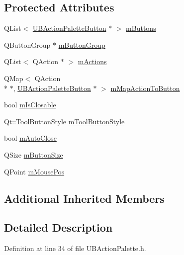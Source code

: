\subsection*{Protected Attributes}
\begin{DoxyCompactItemize}
\item 
Q\-List$<$ \hyperlink{class_u_b_action_palette_button}{U\-B\-Action\-Palette\-Button} $\ast$ $>$ \hyperlink{class_u_b_action_palette_a533f91782bfb170d961413b39671ed03}{m\-Buttons}
\item 
Q\-Button\-Group $\ast$ \hyperlink{class_u_b_action_palette_abee5fd5d774e46838952b4632add4e46}{m\-Button\-Group}
\item 
Q\-List$<$ Q\-Action $\ast$ $>$ \hyperlink{class_u_b_action_palette_a5c4efb6a44c5e95f151c9ab00cdd57f7}{m\-Actions}
\item 
Q\-Map$<$ Q\-Action \\*
$\ast$, \hyperlink{class_u_b_action_palette_button}{U\-B\-Action\-Palette\-Button} $\ast$ $>$ \hyperlink{class_u_b_action_palette_a4278be12faa1ca4cbbb360fb360a12d1}{m\-Map\-Action\-To\-Button}
\item 
bool \hyperlink{class_u_b_action_palette_a7cacdc4a079b01dd9f8a93d407158b34}{m\-Is\-Closable}
\item 
Qt\-::\-Tool\-Button\-Style \hyperlink{class_u_b_action_palette_a8db1c682386ed21c1fdb6773798344ec}{m\-Tool\-Button\-Style}
\item 
bool \hyperlink{class_u_b_action_palette_af2223114a8714b10a9bcb0289a7e133e}{m\-Auto\-Close}
\item 
Q\-Size \hyperlink{class_u_b_action_palette_aa9169370f744833ae9b9d2e67d600ccc}{m\-Button\-Size}
\item 
Q\-Point \hyperlink{class_u_b_action_palette_a8df7d8b1f26b417c8646de24b0a025af}{m\-Mouse\-Pos}
\end{DoxyCompactItemize}
\subsection*{Additional Inherited Members}


\subsection{Detailed Description}


Definition at line 34 of file U\-B\-Action\-Palette.\-h.



